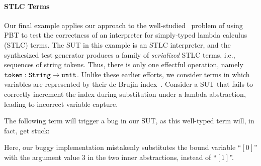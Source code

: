 \paragraph{STLC Terms}
  Our final example applies our approach to the
  well-studied~\cite{BeginnerLuck,CoverageType,FQL24} problem of using PBT
  to test the correctness of an interpreter for simply-typed lambda
  calculus (STLC) terms.
  The SUT in this example is an STLC interpreter, and
  the synthesized test generator produces a family of \emph{serialized}
  STLC terms, i.e., sequences of string tokens.
  Thus, there is only one effectful operation, namely
  $\boldsymbol{{\tt token}} : {\tt String} \to {\tt unit}$.%
  Unlike these earlier efforts, we consider
  terms in which variables are represented by their de Brujin
  index~\cite{DeBruijn}. Consider a SUT that fails to correctly
  increment the index during substitution under a lambda abstraction,
  leading to incorrect variable capture. %
  \vspace{-.4cm} \par{}\vspace{-.5cm} \par\nobreak\noindent
The following term will trigger a bug in our SUT, as this well-typed
term will, in fact, get stuck: %
\vspace{-.4cm} \par{}\vspace{-.5cm} \par\nobreak\noindent %
Here, our buggy implementation mistakenly substitutes the bound
variable ``$[0]$'' with the argument value $3$ in the two inner
abstractions, instead of ``$[1]$''.

